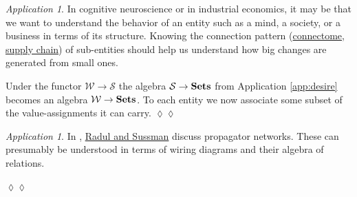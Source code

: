 \documentclass{book}
\def\mc{\mathcal}
\def\to{\rightarrow}
\def\Sets{{\bf Sets}}
\def\mcS{\mc{S}}
\def\mcW{\mc{W}}
\theoremstyle{remark}
\newtheorem{app}[subsubsection]{Application}
\newenvironment{application}{\begin{app}}{\hspace*{\fill}$\lozenge\lozenge$\end{app}}
\theoremstyle{definition}
\begin{document}
\begin{application}

In cognitive neuroscience or in industrial economics, it may be that we want to understand the behavior of an entity such as a mind, a society, or a business in terms of its structure. Knowing the connection pattern (\href{http://en.wikipedia.org/wiki/Connectome}{connectome}, \href{http://en.wikipedia.org/wiki/Supply_chain}{supply chain}) of sub-entities should help us understand how big changes are generated from small ones.

Under the functor $\mcW\to\mcS$ the algebra $\mcS\to\Sets$ from Application \ref{app:desire} becomes an algebra $\mcW\to\Sets$. To each entity we now associate some subset of the value-assignments it can carry. 
\end{application}

\begin{application}

In \cite{RS}, \href{http://dspace.mit.edu/bitstream/handle/1721.1/44215/MIT-CSAIL-TR-2009-002.pdf?sequence=1}{Radul and Sussman} discuss propagator networks. These can presumably be understood in terms of wiring diagrams and their algebra of relations.

\end{application}
 

\printindex
\end{document}
